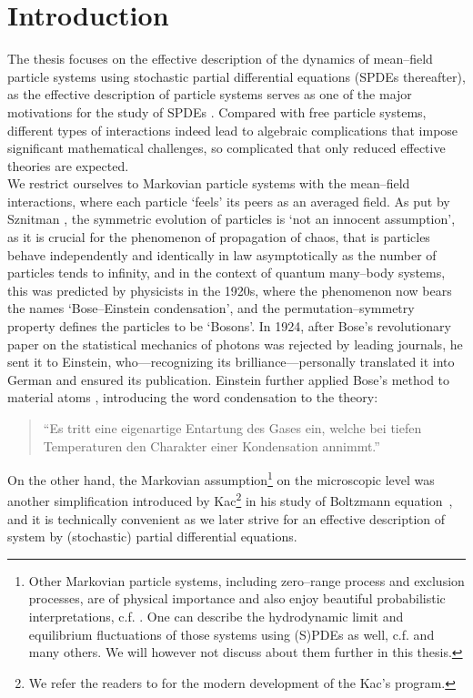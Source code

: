 \chapter{Introduction}

The thesis focuses on the effective description of the dynamics of mean--field particle systems using stochastic partial differential equations (SPDEs thereafter), as the effective description of particle systems serves as one of the major motivations for the study of SPDEs \cite{funaki1984scaling,hairer2013kpz, goncalves2015kpz}. Compared with free particle systems, different types of interactions indeed lead to algebraic complications that impose significant mathematical challenges, so complicated that only reduced effective theories are expected.\\

We restrict ourselves to Markovian particle systems with the mean--field interactions, where each particle `feels' its peers as an averaged field. As put by Sznitman \cite{sznitman1991topics}, the symmetric evolution of particles is `not an innocent assumption', as it is crucial for the phenomenon of propagation of chaos, that is particles behave independently and identically in law asymptotically as the number of particles tends to infinity, and in the context of quantum many--body systems, this was predicted by physicists in the 1920s, where the phenomenon now bears the names `Bose--Einstein condensation', and the permutation--symmetry property defines the particles to be `Bosons'. In 1924, after Bose’s revolutionary paper  \cite{Bose1924} on the statistical mechanics of photons was rejected by leading journals, he sent it to Einstein, who—recognizing its brilliance—personally translated it into German and ensured its publication. Einstein further applied Bose's method to material atoms \cite{Einstein1925}, introducing the word condensation to the theory: 
\begin{quote}
``Es tritt eine eigenartige Entartung des Gases ein, welche bei tiefen Temperaturen den Charakter einer Kondensation annimmt.''
\end{quote}

On the other hand, the Markovian assumption\footnote{Other Markovian particle systems, including zero--range process and exclusion processes, are of physical importance and also enjoy beautiful probabilistic interpretations, c.f. \cite{Liggett1985,Guo1988,Kipnis1986}. One can describe the hydrodynamic limit and equilibrium fluctuations of those systems using (S)PDEs as well, c.f. \cite{Bertini1997, Spohn1991,Giacomin2005, Quastel2012, Jara2009} and many others.  We will however not discuss about them further in this thesis.} on the microscopic level was another simplification introduced by Kac\footnote{We refer the readers to \cite{MischlerMouhot2013} for the modern development of the Kac's program.} in his study of Boltzmann equation~\cite{kac1956foundations}, and it is technically convenient as we later strive for an effective description of system by (stochastic) partial differential equations. 

